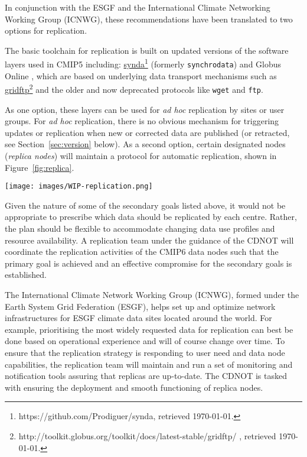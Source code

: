 \documentclass[gmd,manuscript]{copernicus}
\begin{document}
In conjunction with the ESGF and the International Climate Networking
Working Group (ICNWG), these recommendations have been translated to
two options for replication.

The basic toolchain for replication is built on updated versions of
the software layers used in CMIP5 including:
\href{https://github.com/Prodiguer/synda}{synda}\footnote{https://github.com/Prodiguer/synda,
  retrieved \today.} (formerly \texttt{synchrodata}) and Globus Online
\citep{ref:chardetal2015}, which are based on underlying data
transport mechanisms such as
\href{http://toolkit.globus.org/toolkit/docs/latest-stable/gridftp/
}{gridftp}\footnote{http://toolkit.globus.org/toolkit/docs/latest-stable/gridftp/
  , retrieved \today.} and the older and now deprecated protocols like
\texttt{wget} and \texttt{ftp}.

As one option, these layers can be used for \emph{ad hoc} replication
by sites or user groups. For \emph{ad hoc} replication, there is no
obvious mechanism for triggering updates or replication when new or
corrected data are published (or retracted, see
Section~\ref{sec:version} below). As a second option, certain
designated nodes (\emph{replica nodes}) will maintain a protocol for
automatic replication, shown in Figure~\ref{fig:replica}.

\begin{figure*}
  \begin{center}
    \texttt{[image: images/WIP-replication.png]}
  \end{center}
  \caption{CMIP6 replication from data nodes to replica centres and
    between replica centres coordinated by a CMIP6 replication team,
    under the guidance of the CDNOT.}
  \label{fig:replica}
\end{figure*}

Given the nature of some of the secondary goals listed above, it would
not be appropriate to prescribe which data should be replicated by
each centre. Rather, the plan should be flexible to accommodate
changing data use profiles and resource availability. A replication
team under the guidance of the CDNOT will coordinate the replication
activities of the CMIP6 data nodes such that the primary goal is
achieved and an effective compromise for the secondary goals is
established.

The International Climate Network Working Group (ICNWG), formed under
the Earth System Grid Federation (ESGF), helps set up and optimize
network infrastructures for ESGF climate data sites located around the
world. For example, prioritising the most widely requested data for
replication can best be done based on operational experience and will
of course change over time. To ensure that the replication strategy is
responding to user need and data node capabilities, the replication
team will maintain and run a set of monitoring and notification tools
assuring that replicas are up-to-date. The CDNOT is tasked with
ensuring the deployment and smooth functioning of replica nodes.
\end{document}
